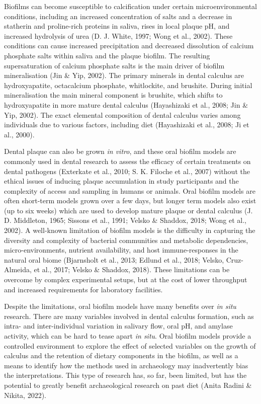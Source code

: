 \documentclass[
  letterpaper,
]{book}
\begin{document}
Biofilms can become susceptible to calcification under certain
microenvironmental conditions, including an increased concentration of
salts and a decrease in statherin and proline-rich proteins in saliva,
rises in local plaque pH, and increased hydrolysis of urea (D. J. White,
1997; Wong et al., 2002). These conditions can cause increased
precipitation and decreased dissolution of calcium phosphate salts
within saliva and the plaque biofilm. The resulting supersaturation of
calcium phosphate salts is the main driver of biofilm mineralisation
(Jin \& Yip, 2002). The primary minerals in dental calculus are
hydroxyapatite, octacalcium phosphate, whitlockite, and brushite. During
initial mineralisation the main mineral component is brushite, which
shifts to hydroxyapatite in more mature dental calculus (Hayashizaki et
al., 2008; Jin \& Yip, 2002). The exact elemental composition of dental
calculus varies among individuals due to various factors, including diet
(Hayashizaki et al., 2008; Ji et al., 2000).

Dental plaque can also be grown \emph{in vitro}, and these oral biofilm
models are commonly used in dental research to assess the efficacy of
certain treatments on dental pathogens (Exterkate et al., 2010; S. K.
Filoche et al., 2007) without the ethical issues of inducing plaque
accumulation in study participants and the complexity of access and
sampling in humans or animals. Oral biofilm models are often short-term
models grown over a few days, but longer term models also exist (up to
six weeks) which are used to develop mature plaque or dental calculus
(J. D. Middleton, 1965; Sissons et al., 1991; Velsko \& Shaddox, 2018;
Wong et al., 2002). A well-known limitation of biofilm models is the
difficulty in capturing the diversity and complexity of bacterial
communities and metabolic dependencies, micro-environments, nutrient
availability, and host immune-responses in the natural oral biome
(Bjarnsholt et al., 2013; Edlund et al., 2018; Velsko, Cruz-Almeida, et
al., 2017; Velsko \& Shaddox, 2018). These limitations can be overcome
by complex experimental setups, but at the cost of lower throughput and
increased requirements for laboratory facilities.

Despite the limitations, oral biofilm models have many benefits over
\emph{in situ} research. There are many variables involved in dental
calculus formation, such as intra- and inter-individual variation in
salivary flow, oral pH, and amylase activity, which can be hard to tease
apart \emph{in situ}. Oral biofilm models provide a controlled
environment to explore the effect of selected variables on the growth of
calculus and the retention of dietary components in the biofilm, as well
as a means to identify how the methods used in archaeology may
inadvertently bias the interpretations. This type of research has, so
far, been limited, but has the potential to greatly benefit
archaeological research on past diet (Anita Radini \& Nikita, 2022).
\end{document}

